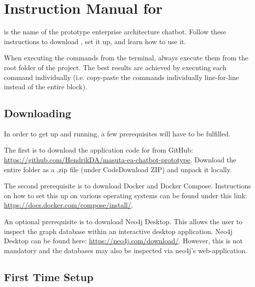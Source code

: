 \chapter{Instruction Manual for \prototype}
\label{appendix:ch:instructions}
\prototype{} is the name of the prototype enterprise architecture chatbot. Follow these instructions to download \prototype{}, set it up, and learn how to use it.

When executing the commands from the terminal, always execute them from the root folder of the project. The best results are achieved by executing each command individually (i.e. copy-paste the commands individually line-for-line instead of the entire block).

\section{Downloading \prototype{}}
\label{appendix:instructions:downloading}
In order to get \prototype{} up and running, a few prerequisites will have to be fulfilled.

The first is to download the application code for \prototype{} from GitHub: \href{https://github.com/HendrikDA/masuta-ea-chatbot-prototype}{https://github.com/HendrikDA/masuta-ea-chatbot-prototype}. Download the entire folder as a .zip file (under Code\textrightarrow Download ZIP) and unpack it locally.

The second prerequisite is to download Docker and Docker Compose. Instructions on how to set this up on various operating systems can be found under this link: \href{https://docs.docker.com/compose/install/}{https://docs.docker.com/compose/install/}.

An optional prerequisite is to download Neo4j Desktop. This allows the user to inspect the graph database within an interactive desktop application. Neo4j Desktop can be found here: \href{https://neo4j.com/download/}{https://neo4j.com/download/}. However, this is not mandatory and the databases may also be inspected via neo4j's web-application.

\section{First Time Setup}
\label{appendix:instructions:first}


